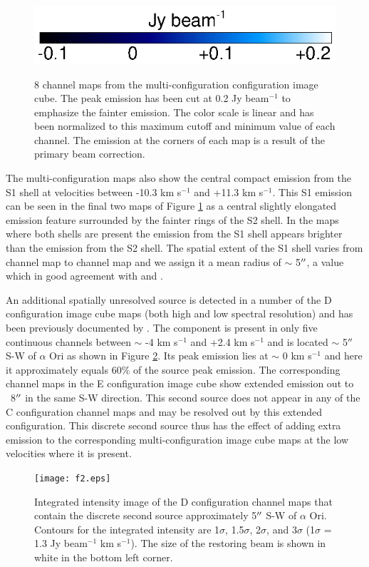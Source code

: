 \documentclass[iop]{emulateapj}
\begin{document}
\begin{figure}[hbt!]
{         }
\includegraphics[trim=0pt 20pt 195pt 10pt]{color_bar.ps}
\caption{8 channel maps from the multi-configuration configuration image cube. The peak emission has been cut at 0.2 Jy beam${{}^{-1}}$ to emphasize the fainter emission. The color scale is linear and has been normalized to this maximum cutoff and minimum value of each channel. The emission at the corners of each map is a result of the primary beam correction.}
\label{fig:fig3}
\end{figure}

The multi-configuration maps also show the central compact emission from the S1 shell at velocities between -10.3 km s${}^{-1}$ and +11.3 km s${}^{-1}$. This S1 emission can be seen in the final two maps of Figure \ref{fig:fig3} as a central slightly elongated emission feature surrounded by the fainter rings of the S2 shell. In the maps where both shells are present the emission from the S1 shell appears brighter than the emission from the S2 shell. The spatial extent of the S1 shell varies from channel map to channel map and we assign it a mean radius of $\sim$ 5$\mbox{$^{\prime\prime}$}$, a value which in good agreement with \cite{2009AIPC.1094..868H} and \cite{2009AJ....137.3558S}. 

An additional spatially unresolved source is detected in a number of the D configuration image cube maps (both high and low spectral resolution) and has been previously documented by \citet{2009AIPC.1094..868H}. The component is present in only five continuous channels between $\sim$ -4 km s${}^{-1}$ and +2.4 km s${}^{-1}$ and is located $\sim$ 5$\mbox{$^{\prime\prime}$}$ S-W of $\alpha$ Ori as shown in Figure \ref{fig:fig4}. Its peak emission lies at $\sim$ 0 km s${}^{-1}$ and here it approximately equals 60$\%$ of the source peak emission. The corresponding channel maps in the E configuration image cube show extended emission out to ~8$\mbox{$^{\prime\prime}$}$ in the same S-W direction. This second source does not appear in any of the C configuration channel maps and may be resolved out by this extended configuration. This discrete second source thus has the effect of adding extra emission to the corresponding multi-configuration image cube maps at the low velocities where it is present.

\begin{figure}
\texttt{[image: f2.eps]}
\caption{Integrated intensity image of the D configuration channel maps that contain the discrete second source approximately 5$\mbox{$^{\prime\prime}$}$ S-W of $\alpha$ Ori. Contours for the integrated intensity are 1$\sigma$, 1.5$\sigma$, 2$\sigma$, and 3$\sigma$ (1$\sigma$ = 1.3 Jy beam${}^{-1}$ km s${}^{-1}$). The size of the restoring beam is shown in white in the bottom left corner.}
\label{fig:fig4}
\end{figure}
\end{document}
